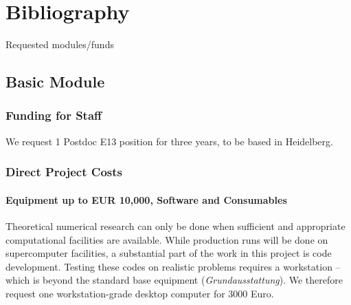 \documentclass[10pt,fleqn,twoside,a4paper]{article}
\begin{document}
\section{Bibliography}

\begingroup
\renewcommand{\section}[2]{}%


\endgroup


\section{Requested modules/funds}
\renewcommand{\leftmark}{\sc Requested modules/funds}
%
\subsection{Basic Module}
%
\subsubsection{Funding for Staff}
%
We request 1 Postdoc E13 position for three years, to be based in Heidelberg.

\subsubsection{Direct Project Costs}

\paragraph{Equipment up to EUR 10,000, Software and Consumables}
Theoretical numerical research can only be done when sufficient and
appropriate computational facilities are available. While production runs
will be done on supercomputer facilities, a substantial part of the work in
this project is code development. Testing these codes on realistic problems
requires a workstation -- which is beyond the standard base equipment
(\textit{Grundausstattung}). We therefore request one workstation-grade
desktop computer for 3000 Euro.
\end{document}
